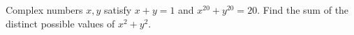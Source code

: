 Complex numbers $x,y$ satisfy $x+y=1$ and $x^{20}+y^{20}=20$. Find the sum of the distinct possible values of $x^2+y^2$.
